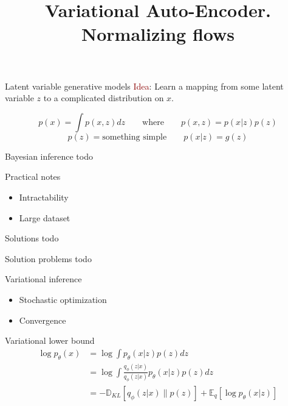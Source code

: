 \documentclass[unicode,11pt]{beamer}
\title{\large{Variational Auto-Encoder. Normalizing flows}}
\begin{document}
\begin{frame}
  \maketitle
\end{frame}

\begin{frame}[fragile]{Latent variable generative models}
\textcolor{darkred}{Idea}: Learn a mapping from some latent variable $z$
to a complicated distribution on $x$.

$$p(x) = \int{p(x, z) dz} \qquad\text{where}\qquad p(x, z) = p(x|z)p(z)$$
$$p(z) = \text{something simple}  \qquad  p(x|z) = g(z)$$
\end{frame}


\begin{frame}[fragile]{Bayesian inference}
todo
\end{frame}


\begin{frame}[fragile]{Practical notes}
  \begin{itemize}
    \item Intractability
    \item Large dataset
  \end{itemize}
\end{frame}

\begin{frame}[fragile]{Solutions}
todo
\end{frame}

\begin{frame}[fragile]{Solution problems}
todo
\end{frame}

\begin{frame}[fragile]{Variational inference}
  \begin{itemize}
    \item Stochastic optimization
    \item Convergence
  \end{itemize}
\end{frame}


\begin{frame}[fragile]{Variational lower bound}
\begin{align*} 
\log {p_\theta (x)} &= \log \int {p_\theta (x|z) p(z) dz} \\
&= \log \int{ \frac{q_\phi (z|x)}{q_\phi (z|x)} p_\theta (x|z) p(z) dz} \\
&= -\mathbb{D}_{KL}[q_\phi (z|x) \parallel p(z)] + \mathbb{E}_q [\log p_\theta (x|z)]
\end{align*} 

\end{frame}
\end{document}
